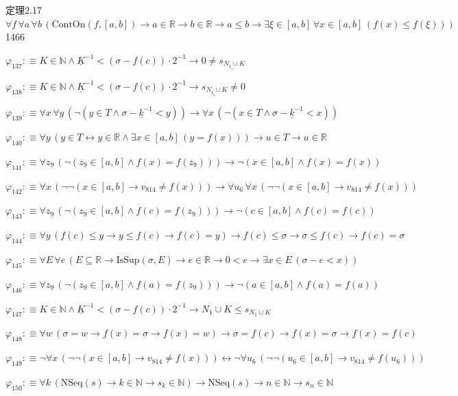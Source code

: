\begin{fullproof}{定理2.17}{$\forall f\,\forall a\,\forall b\,(\mathrm{ContOn}(f,[a,b]) \to a \in \mathbb{R} \to b \in \mathbb{R} \to a \leq b \to \exists \xi \in [a,b]\,\forall x \in [a,b]\,(f(x) \leq f(\xi)))$}{1466}
\begin{abbrevlist}
\item $\varphi_{137} :\equiv K \in \mathbb{N} \land \underline{K}^{-1} < (\sigma - f(c)) \cdot 2^{-1} \to 0 \neq \underline{s_{N_{1} \cup K}}$
\item $\varphi_{138} :\equiv K \in \mathbb{N} \land \underline{K}^{-1} < (\sigma - f(c)) \cdot 2^{-1} \to \underline{s_{N_{1} \cup K}} \neq 0$
\item $\varphi_{139} :\equiv \forall x\,\forall y\,(\neg (y \in T \land \sigma - \underline{k}^{-1} < y)) \to \forall x\,(\neg (x \in T \land \sigma - \underline{k}^{-1} < x))$
\item $\varphi_{140} :\equiv \forall y\,(y \in T \leftrightarrow y \in \mathbb{R} \land \exists x \in [a,b]\,(y = f(x))) \to u \in T \to u \in \mathbb{R}$
\item $\varphi_{141} :\equiv \forall z_{9}\,(\neg (z_{9} \in [a,b] \land f(x) = f(z_{9}))) \to \neg (x \in [a,b] \land f(x) = f(x))$
\item $\varphi_{142} :\equiv \forall x\,(\neg \neg (x \in [a,b] \to v_{814} \neq f(x))) \to \forall u_{6}\,\forall x\,(\neg \neg (x \in [a,b] \to v_{814} \neq f(x)))$
\item $\varphi_{143} :\equiv \forall z_{9}\,(\neg (z_{9} \in [a,b] \land f(c) = f(z_{9}))) \to \neg (c \in [a,b] \land f(c) = f(c))$
\item $\varphi_{144} :\equiv \forall y\,(f(c) \leq y \to y \leq f(c) \to f(c) = y) \to f(c) \leq \sigma \to \sigma \leq f(c) \to f(c) = \sigma$
\item $\varphi_{145} :\equiv \forall E\,\forall e\,(E \subseteq \mathbb{R} \to \mathrm{IsSup}(\sigma,E) \to e \in \mathbb{R} \to 0 < e \to \exists x \in E\,(\sigma - e < x))$
\item $\varphi_{146} :\equiv \forall z_{9}\,(\neg (z_{9} \in [a,b] \land f(a) = f(z_{9}))) \to \neg (a \in [a,b] \land f(a) = f(a))$
\item $\varphi_{147} :\equiv K \in \mathbb{N} \land \underline{K}^{-1} < (\sigma - f(c)) \cdot 2^{-1} \to N_{1} \cup K \leq s_{N_{1} \cup K}$
\item $\varphi_{148} :\equiv \forall w\,(\sigma = w \to f(x) = \sigma \to f(x) = w) \to \sigma = f(c) \to f(x) = \sigma \to f(x) = f(c)$
\item $\varphi_{149} :\equiv \neg \forall x\,(\neg \neg (x \in [a,b] \to v_{814} \neq f(x))) \leftrightarrow \neg \forall u_{6}\,(\neg \neg (u_{6} \in [a,b] \to v_{814} \neq f(u_{6})))$
\item $\varphi_{150} :\equiv \forall k\,(\mathrm{NSeq}(s) \to k \in \mathbb{N} \to s_{k} \in \mathbb{N}) \to \mathrm{NSeq}(s) \to n \in \mathbb{N} \to s_{n} \in \mathbb{N}$

\end{abbrevlist}
\end{fullproof}
